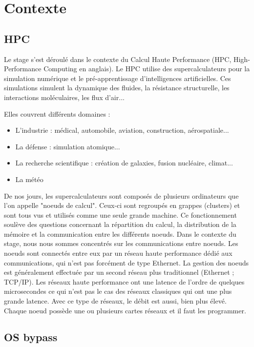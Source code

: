 \section{Contexte}

\subsection{HPC}

Le stage s'est déroulé dans le contexte du Calcul Haute Performance (HPC, High-Performance Computing en anglais).
Le HPC utilise des supercalculateurs pour la simulation numérique et le pré-apprentissage d'intelligences artificielles.
Ces simulations simulent la dynamique des fluides, la résistance structurelle, les interactions moléculaires, les flux d'air...

\bigskip

\noindent{}Elles couvrent différents domaines :
\begin{itemize}
  \item L'industrie : médical, automobile, aviation, construction, aérospatiale...
  \item La défense : simulation atomique...
  \item La recherche scientifique : création de galaxies, fusion nucléaire, climat...
  \item La météo
\end{itemize}

\bigskip

De nos jours, les supercalculateurs sont composés de plusieurs ordinateurs que l'on appelle "noeuds de calcul".
Ceux-ci sont regroupés en grappes (clusters) et sont tous vus et utilisés comme une seule grande machine.
Ce fonctionnement soulève des questions concernant la répartition du calcul, la distribution de la mémoire et la communication entre les différents noeuds.
Dans le contexte du stage, nous nous sommes concentrés sur les communications entre noeuds.
Les noeuds sont connectés entre eux par un réseau haute performance dédié aux communications, qui n'est pas forcément de type Ethernet.
La gestion des noeuds est généralement effectuée par un second réseau plus traditionnel (Ethernet ; TCP/IP).
Les réseaux haute performance ont une latence de l'ordre de quelques microsecondes ce qui n'est pas le cas des réseaux classiques qui ont une plus grande latence.
Avec ce type de réseaux, le débit est aussi, bien plus élevé.
Chaque noeud possède une ou plusieurs cartes réseaux et il faut les programmer.

\subsection{OS bypass}

